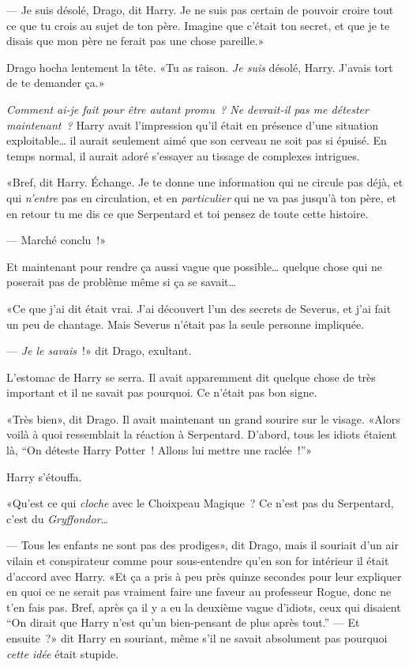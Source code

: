 --- Je suis désolé, Drago, dit Harry. Je ne suis pas certain de pouvoir croire tout ce que tu crois au sujet de ton père. Imagine que c'était ton secret, et que je te disais que mon père ne ferait pas une chose pareille.»

Drago hocha lentement la tête. «Tu as raison. \emph{Je suis} désolé, Harry. J'avais tort de te demander ça.»

\emph{Comment ai-je fait pour être autant promu~? Ne devrait-il pas me détester maintenant~?} Harry avait l'impression qu'il était en présence d'une situation exploitable… il aurait seulement aimé que son cerveau ne soit pas si épuisé. En temps normal, il aurait adoré s'essayer au tissage de complexes intrigues.

«Bref, dit Harry. Échange. Je te donne une information qui ne circule pas déjà, et qui \emph{n'entre} pas en circulation, et en \emph{particulier} qui ne va pas jusqu'à ton père, et en retour tu me dis ce que Serpentard et toi pensez de toute cette histoire.

--- Marché conclu~!»

Et maintenant pour rendre ça aussi vague que possible… quelque chose qui ne poserait pas de problème même si ça se savait…

«Ce que j'ai dit était vrai. J'ai découvert l'un des secrets de Severus, et j'ai fait un peu de chantage. Mais Severus n'était pas la seule personne impliquée.

--- \emph{Je le savais}~!» dit Drago, exultant.

L'estomac de Harry se serra. Il avait apparemment dit quelque chose de très important et il ne savait pas pourquoi. Ce n'était pas bon signe.

«Très bien», dit Drago. Il avait maintenant un grand sourire sur le visage. «Alors voilà à quoi ressemblait la réaction à Serpentard. D'abord, tous les idiots étaient là, “On déteste Harry Potter~! Allons lui mettre une raclée~!”»

Harry s'étouffa.

«Qu'est ce qui \emph{cloche} avec le Choixpeau Magique~? Ce n'est pas du Serpentard, c'est du \emph{Gryffondor}…

--- Tous les enfants ne sont pas des prodiges», dit Drago, mais il souriait d'un air vilain et conspirateur comme pour sous-entendre qu'en son for intérieur il était d'accord avec Harry. «Et ça a pris à peu près quinze secondes pour leur expliquer en quoi ce ne serait pas vraiment faire une faveur au professeur Rogue, donc ne t'en fais pas. Bref, après ça il y a eu la deuxième vague d'idiots, ceux qui disaient “On dirait que Harry n'est qu'un bien-pensant de plus après tout.”
--- Et ensuite~?» dit Harry en souriant, même s'il ne savait absolument pas pourquoi \emph{cette idée} était stupide.

